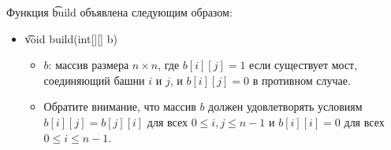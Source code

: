 Функция \t{build} объявлена следующим образом:

\begin{itemize}
\item \t{void build(int[][] b)}
\begin{itemize}

\item $b$: массив размера $n \times n$, где $b[i][j]=1$ если существует мост, соединяющий башни $i$ и $j$, и $b[i][j]=0$ в противном случае.
\item Обратите внимание, что массив $b$ должен удовлетворять условиям $b[i][j]=b[j][i]$ для всех $0 \leq i,j \leq n-1$ и $b[i][i] = 0$ для всех $0 \leq i \leq n-1$.
\end{itemize}
\end{itemize}




